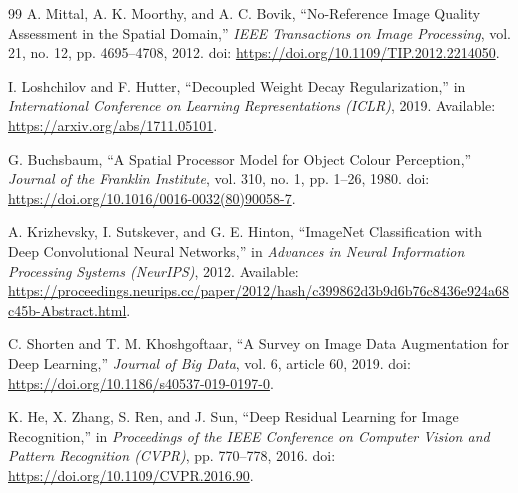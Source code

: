 \documentclass[10pt,twocolumn]{article}
\begin{document}
\begin{thebibliography}{99}
A. Mittal, A. K. Moorthy, and A. C. Bovik,
\newblock ``No-Reference Image Quality Assessment in the Spatial Domain,''
\newblock \emph{IEEE Transactions on Image Processing}, vol. 21, no. 12, pp. 4695--4708, 2012.
\newblock doi: \url{https://doi.org/10.1109/TIP.2012.2214050}.

I. Loshchilov and F. Hutter,
\newblock ``Decoupled Weight Decay Regularization,''
\newblock in \emph{International Conference on Learning Representations (ICLR)}, 2019.
\newblock Available: \url{https://arxiv.org/abs/1711.05101}.

G. Buchsbaum,
\newblock ``A Spatial Processor Model for Object Colour Perception,''
\newblock \emph{Journal of the Franklin Institute}, vol. 310, no. 1, pp. 1--26, 1980.
\newblock doi: \url{https://doi.org/10.1016/0016-0032(80)90058-7}.

A. Krizhevsky, I. Sutskever, and G. E. Hinton,
\newblock ``ImageNet Classification with Deep Convolutional Neural Networks,''
\newblock in \emph{Advances in Neural Information Processing Systems (NeurIPS)}, 2012.
\newblock Available: \url{https://proceedings.neurips.cc/paper/2012/hash/c399862d3b9d6b76c8436e924a68c45b-Abstract.html}.

C. Shorten and T. M. Khoshgoftaar,
\newblock ``A Survey on Image Data Augmentation for Deep Learning,''
\newblock \emph{Journal of Big Data}, vol. 6, article 60, 2019.
\newblock doi: \url{https://doi.org/10.1186/s40537-019-0197-0}.

K. He, X. Zhang, S. Ren, and J. Sun,
\newblock ``Deep Residual Learning for Image Recognition,''
\newblock in \emph{Proceedings of the IEEE Conference on Computer Vision and Pattern Recognition (CVPR)}, pp. 770--778, 2016.
\newblock doi: \url{https://doi.org/10.1109/CVPR.2016.90}.

\end{thebibliography}
\end{document}
